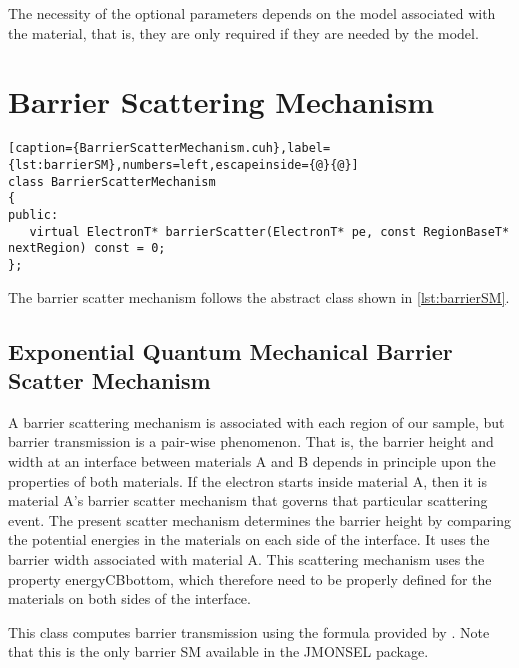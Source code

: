 The necessity of the optional parameters depends on the model associated with the material, that is, they are only required if they are needed by the model.

\section{Barrier Scattering Mechanism}\label{impl:barrier_sm}
\begin{lstlisting}[caption={BarrierScatterMechanism.cuh},label={lst:barrierSM},numbers=left,escapeinside={@}{@}]
class BarrierScatterMechanism
{
public:
   virtual ElectronT* barrierScatter(ElectronT* pe, const RegionBaseT* nextRegion) const = 0;
};
\end{lstlisting}

The barrier scatter mechanism follows the abstract class shown in \ref{lst:barrierSM}.

\subsection{Exponential Quantum Mechanical Barrier Scatter Mechanism}
A barrier scattering mechanism is associated with each region of our sample, but barrier transmission is a pair-wise phenomenon. That is, the barrier height and width at an interface between materials A and B depends in principle upon the properties of both materials. If the electron starts inside material A, then it is material A's barrier scatter mechanism that governs that particular scattering event. The present scatter mechanism determines the barrier height by comparing the potential energies in the materials on each side of the interface. It uses the barrier width associated with material A. This scattering mechanism uses the property energyCBbottom, which therefore need to be properly defined for the materials on both sides of the interface.

This class computes barrier transmission using the formula provided by \cite{Landau}. Note that this is the only barrier SM available in the JMONSEL package. 

